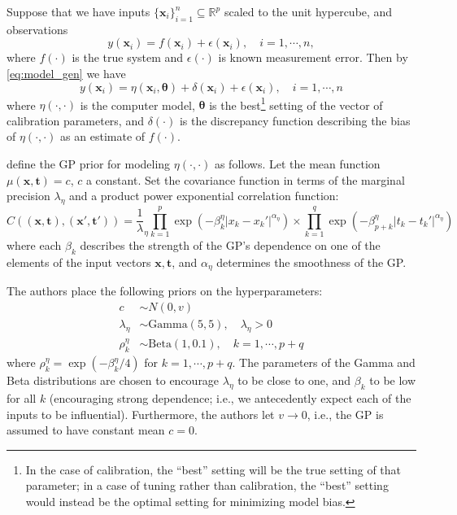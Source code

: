 \documentclass{article}
\begin{document}
Suppose that we have inputs $\{\mathbf x_i\}_{i=1}^n\subseteq \mathbb R^p$ scaled to the unit hypercube, and observations 
\begin{equation}\label{eq:2}
y(\mathbf x_i) = f(\mathbf x_i) + \epsilon(\mathbf x_i),\quad i=1,\cdots,n,
\end{equation}
where $f(\cdot)$ is the true system and $\epsilon(\cdot)$ is known measurement error. Then by \eqref{eq:model_gen} we have
\begin{equation}\label{eq:2}
y(\mathbf x_i) = \eta(\mathbf x_i,\boldsymbol \theta) + \delta(\mathbf x_i) + \epsilon(\mathbf x_i),\quad i=1,\cdots,n
\end{equation}
where $\eta(\cdot,\cdot)$ is the computer model, $\boldsymbol \theta$ is the best\footnote{In the case of calibration, the ``best'' setting will be the true setting of that parameter; in a case of tuning rather than calibration, the ``best'' setting would instead be the optimal setting for minimizing model bias.}
setting of the vector of calibration parameters, and $\delta(\cdot)$ is the discrepancy function describing the bias of $\eta(\cdot,\cdot)$ as an estimate of $f(\cdot)$.

\citeauthor*{Williams2006} define the GP prior for modeling $\eta(\cdot,\cdot)$ as follows. Let the mean function $\mu(\mathbf x,\mathbf t)=c$, $c$ a constant. Set the covariance function in terms of the marginal precision $\lambda_\eta$ and a product power exponential correlation function:
\begin{equation}\label{eq:Hig_cov}
C((\mathbf x,\mathbf t),(\mathbf x',\mathbf t')) = \frac 1\lambda_\eta \prod_{k=1}^{p}
\exp \left(-\beta^\eta_k|x_k-x_k'|^{\alpha_\eta}\right) \times
\prod_{k=1}^{q}
\exp \left(-\beta^\eta_{p+k}|t_k-t_k'|^{\alpha_\eta}\right)
\end{equation}
where each $\beta_k$ describes the strength of the GP's dependence on one of the elements of the input vectors $\mathbf x,\mathbf t$, and $\alpha_\eta$ determines the smoothness of the GP. 

The authors place the following priors on the hyperparameters:
\begin{equation}
\begin{aligned}
c&\sim N(0,v)\\
\lambda_\eta&\sim \mathrm{Gamma}(5,5),\quad\lambda_\eta>0\\
\rho_k^\eta &\sim \mathrm{Beta}(1,0.1),\quad k=1,\cdots,p+q
\end{aligned}
\end{equation}
where $\rho_k^\eta=\exp(-\beta_k^\eta/4)$ for $k=1,\cdots,p+q$. The parameters of the Gamma and Beta distributions are chosen to encourage $\lambda_\eta$ to be close to one, and $\beta_k$ to be low for all $k$ (encouraging strong dependence; i.e., we antecedently expect each of the inputs to be influential). Furthermore, the authors let $v\to0$, i.e., the GP is assumed to have constant mean $c=0$.
\end{document}
